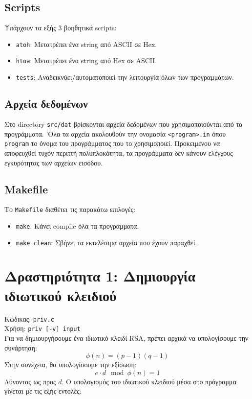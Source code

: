 \documentclass[12pt]{article}
\begin{document}
\subsection{Scripts}

Υπάρχουν τα εξής 3 βοηθητικά scripts:
\begin{itemize}
	\item \lstinline{atoh}: Μετατρέπει ένα string από ASCII σε Hex.
	\item \lstinline{htoa}: Μετατρέπει ένα string από Hex σε ASCII.
	\item \lstinline{tests}: Αναδεικνύει/αυτοματοποιεί την λειτουργία
		όλων των προγραμμάτων.
\end{itemize}

\subsection{Αρχεία δεδομένων}

Στο directory \lstinline{src/dat} βρίσκονται αρχεία δεδομένων που
χρησιμοποιούνται από τα προγράμματα. 'Ολα τα αρχεία ακολουθούν την ονομασία
\lstinline{<program>.in} όπου \lstinline{program} το όνομα του προγράμματος που
το χρησιμοποιεί. Προκειμένου να αποφευχθεί τυχόν περιττή πολυπλοκότητα, τα
προγράμματα δεν κάνουν ελέγχους εγκυρότητας των αρχείων εισόδου.

\subsection{Makefile}

Το \lstinline{Makefile} διαθέτει τις παρακάτω επιλογές:
\begin{itemize}
	\item \lstinline{make}: Κάνει compile όλα τα προγράμματα.
	\item \lstinline{make clean}: Σβήνει τα εκτελέσιμα αρχεία που έχουν
		παραχθεί.
\end{itemize}

\section{Δραστηριότητα 1: Δημιουργία ιδιωτικού κλειδιού}

Κώδικας: \lstinline{priv.c} \\
Χρήση: \lstinline{priv [-v] input} \\

Για να δημιουργήσουμε ένα ιδιωτικό κλειδί RSA, πρέπει αρχικά να υπολογίσουμε
την συνάρτηση:
\[\phi(n) = (p-1)(q-1)\]
Στην συνέχεια, θα υπολογίσουμε την εξίσωση:
\[e \cdot d \mod \phi(n) = 1\]
Λύνοντας ως προς $d$. Ο υπολογισμός του ιδιωτικού κλειδιού μέσα στο πρόγραμμα
γίνεται με τις εξής εντολές: \\
\end{document}
